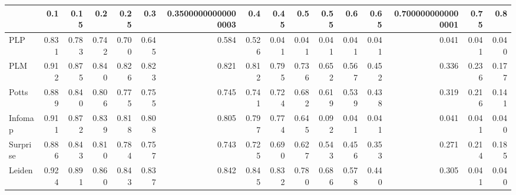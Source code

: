 \begin{tabular}{lrrrrrrrrrrrrrrr}
\toprule
{} &   0.1 &  0.15 &   0.2 &  0.25 &   0.3 & 0.35000000000000003 &   0.4 &  0.45 &   0.5 &  0.55 &   0.6 &  0.65 & 0.7000000000000001 &  0.75 &   0.8 \\
\midrule
PLP      & 0.831 & 0.783 & 0.742 & 0.700 & 0.645 &               0.584 & 0.526 & 0.041 & 0.041 & 0.041 & 0.041 & 0.041 &              0.041 & 0.041 & 0.040 \\
PLM      & 0.912 & 0.875 & 0.840 & 0.826 & 0.823 &               0.821 & 0.812 & 0.795 & 0.736 & 0.652 & 0.567 & 0.452 &              0.336 & 0.236 & 0.177 \\
Potts    & 0.889 & 0.840 & 0.806 & 0.775 & 0.755 &               0.745 & 0.741 & 0.724 & 0.682 & 0.619 & 0.539 & 0.438 &              0.319 & 0.216 & 0.141 \\
Infomap  & 0.911 & 0.872 & 0.839 & 0.818 & 0.808 &               0.805 & 0.797 & 0.774 & 0.645 & 0.092 & 0.041 & 0.041 &              0.041 & 0.041 & 0.040 \\
Surprise & 0.886 & 0.843 & 0.810 & 0.784 & 0.757 &               0.743 & 0.725 & 0.690 & 0.627 & 0.543 & 0.456 & 0.353 &              0.271 & 0.214 & 0.185 \\
Leiden   & 0.924 & 0.891 & 0.860 & 0.843 & 0.837 &               0.842 & 0.845 & 0.832 & 0.780 & 0.686 & 0.578 & 0.440 &              0.305 & 0.041 & 0.040 \\
\bottomrule
\end{tabular}
